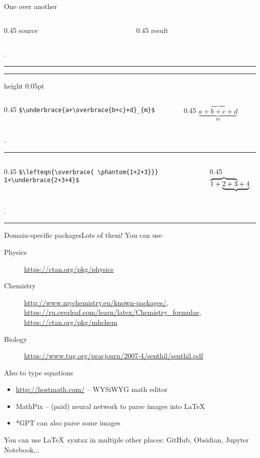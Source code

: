 \begin{frame}[fragile]{One over another\magicPage}\relax

\newcommand{\appendTline}[2]{\vspace*{10pt}\begin{columns}
        \begin{column}{0.45\textwidth}
          \hfill #1 
        \end{column}
        \begin{column}{0.45\textwidth}
             \hfill #2\hfill \hfill
        \end{column}
    \end{columns}
    \vphantom.
    \hrule
    }

    \cprotect[mm]\appendTline{\csk source}{\csk result}
    \hrule height 0.05pt
    
    \cprotect[mm]\appendTline{\lstinline|$\underbrace{a+\overbrace{b+c}+d}_{m}$|}{$\underbrace{a+\overbrace{b+c}+d}_{m}$}
    
    \cprotect[mm]\appendTline{\lstinline|$\lefteqn{\overbrace{ \phantom{1+2+3}}} 1+\underbrace{2+3+4}$|}{$\lefteqn{\overbrace{ \phantom{1+2+3}}} 1+\underbrace{2+3+4}$}
    
\end{frame}

\begin{frame}{Domain-specific packages\magicPage}{Lots of them!}\relax
You can use 
    \begin{description}
        \item[Physics] \url{https://ctan.org/pkg/physics}
        \item[Chemistry] \url{http://www.mychemistry.eu/known-packages/}, \url{https://ru.overleaf.com/learn/latex/Chemistry_formulae}, \url{https://ctan.org/pkg/mhchem}
        \item[Biology] \url{https://www.tug.org/pracjourn/2007-4/senthil/senthil.pdf} 
    \end{description}
     
\end{frame}

\begin{frame}{Also to type equations\magicPage}\relax
     \begin{itemize}
         \item \url{http://hostmath.com/} -- WYSiWYG math editor
         \item MathPix -- (paid) neural network to parse images into \LaTeX
         \item *GPT can also parse some images
     \end{itemize}
     
     You can use \LaTeX\ syntax in multiple other places: GitHub, Obsidian, Jupyter Notebook,..
\end{frame}

